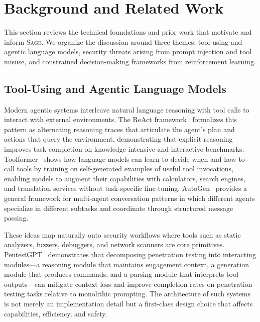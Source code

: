 \documentclass[sigconf,anonymous]{acmart}
\newcommand{\SAGE}{\textsc{Sage}\xspace}
\begin{document}
\section{Background and Related Work}
\label{sec:background}

This section reviews the technical foundations and prior work that motivate and inform \SAGE. We organize the discussion around three themes: tool-using and agentic language models, security threats arising from prompt injection and tool misuse, and constrained decision-making frameworks from reinforcement learning.

\subsection{Tool-Using and Agentic Language Models}

Modern agentic systems interleave natural language reasoning with tool calls to interact with external environments. The ReAct framework~\cite{yao2023react} formalizes this pattern as alternating reasoning traces that articulate the agent's plan and actions that query the environment, demonstrating that explicit reasoning improves task completion on knowledge-intensive and interactive benchmarks. Toolformer~\cite{schick2023toolformer} shows how language models can learn to decide when and how to call tools by training on self-generated examples of useful tool invocations, enabling models to augment their capabilities with calculators, search engines, and translation services without task-specific fine-tuning. AutoGen~\cite{wu2023autogen} provides a general framework for multi-agent conversation patterns in which different agents specialize in different subtasks and coordinate through structured message passing.

These ideas map naturally onto security workflows where tools such as static analyzers, fuzzers, debuggers, and network scanners are core primitives. PentestGPT~\cite{deng2024pentestgpt} demonstrates that decomposing penetration testing into interacting modules---a reasoning module that maintains engagement context, a generation module that produces commands, and a parsing module that interprets tool outputs---can mitigate context loss and improve completion rates on penetration testing tasks relative to monolithic prompting. The architecture of such systems is not merely an implementation detail but a first-class design choice that affects capabilities, efficiency, and safety.
\end{document}
